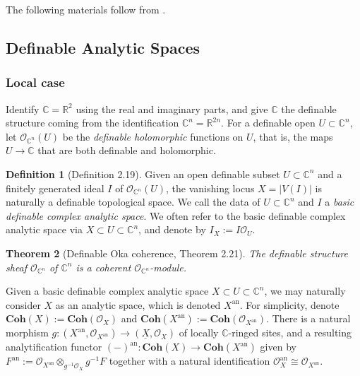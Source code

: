 \documentclass{amsart}
\newtheorem{theorem}{Theorem}[subsection]
\theoremstyle{definition}
\newtheorem{definition}[theorem]{Definition}
\numberwithin{equation}{section}
\newcommand{\analytic}{\mathrm{an}}
\begin{document}
The following materials follow from \cite{zbMATH07662555}.

\subsection{Definable Analytic Spaces}
\subsubsection{Local case}
Identify $\mathbb{C} = \mathbb{R}^2$ using the real and imaginary parts,
and give $\mathbb{C}$ the definable structure coming from the identification $\mathbb{C}^n = \mathbb{R}^{2n}$.
For a definable open $U \subset \mathbb{C}^n$,
let $\mathcal{O}_{\mathbb{C}^n}(U)$ be the \emph{definable holomorphic} functions on $U$,
that is, the maps $U \to \mathbb{C}$ that are both definable and holomorphic.

\begin{definition}[Definition 2.19]
  Given an open definable subset $U \subset \mathbb{C}^n$ and 
  a finitely generated ideal $I$ of $\mathcal{O}_{\mathbb{C}^n}(U)$,
  the vanishing locus $X = |V(I)|$ is naturally a definable topological space.
  We call the data of $U \subset \mathbb{C}^n$ and $I$ a \emph{basic definable complex analytic space}.
  We often refer to the basic definable complex analytic space via $X \subset U \subset \mathbb{C}^n$,
  and denote by $I_X := I\mathcal{O}_U$.
\end{definition}

\begin{theorem}[Definable Oka coherence, Theorem 2.21]
  The definable structure sheaf $\mathcal{O}_{\mathbb{C}^n}$ of $\mathbb{C}^n$ is a coherent $\mathcal{O}_{\mathbb{C}^n}$-module.
\end{theorem}

Given a basic definable complex analytic space $X \subset U \subset \mathbb{C}^n$,
we may naturally consider $X$ as an analytic space,
which is denoted $X^{\analytic}$.
For simplicity, denote $\mathbf{Coh}(X) := \mathbf{Coh}(\mathcal{O}_X)$ and
$\mathbf{Coh}(X^{\analytic}) := \mathbf{Coh}(\mathcal{O}_{X^{\analytic}})$.
There is a natural morphism $g: (X^{\analytic},\mathcal{O}_{X^{\analytic}}) \to (\underline{X},\mathcal{O}_X)$
of locally $\mathbb{C}$-ringed sites,
and a resulting analytification functor $(-)^{\analytic}: \mathbf{Coh}(X) \to \mathbf{Coh}(X^{\analytic})$
given by $F^{\analytic} := \mathcal{O}_{X^{\analytic}} \otimes_{g^{-1}\mathcal{O}_X} g^{-1}F$ together with
a natural identification $\mathcal{O}_X^{\analytic} \cong \mathcal{O}_{X^{\analytic}}$.
\end{document}

